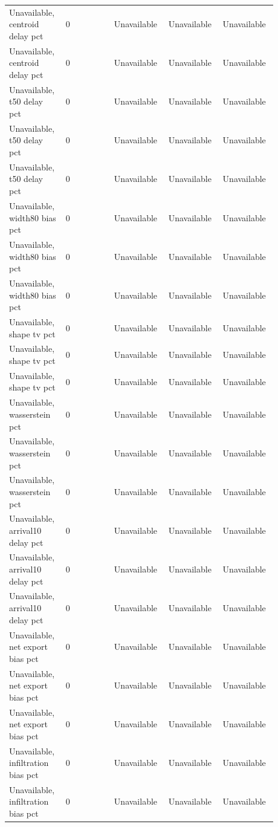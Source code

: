 \begin{longtable}{p{0.1760\linewidth}p{0.1760\linewidth}p{0.1760\linewidth}p{0.1760\linewidth}p{0.1760\linewidth}}
Unavailable, centroid delay pct & 0 & Unavailable & Unavailable & Unavailable \\
Unavailable, centroid delay pct & 0 & Unavailable & Unavailable & Unavailable \\
Unavailable, t50 delay pct & 0 & Unavailable & Unavailable & Unavailable \\
Unavailable, t50 delay pct & 0 & Unavailable & Unavailable & Unavailable \\
Unavailable, t50 delay pct & 0 & Unavailable & Unavailable & Unavailable \\
Unavailable, width80 bias pct & 0 & Unavailable & Unavailable & Unavailable \\
Unavailable, width80 bias pct & 0 & Unavailable & Unavailable & Unavailable \\
Unavailable, width80 bias pct & 0 & Unavailable & Unavailable & Unavailable \\
Unavailable, shape tv pct & 0 & Unavailable & Unavailable & Unavailable \\
Unavailable, shape tv pct & 0 & Unavailable & Unavailable & Unavailable \\
Unavailable, shape tv pct & 0 & Unavailable & Unavailable & Unavailable \\
Unavailable, wasserstein pct & 0 & Unavailable & Unavailable & Unavailable \\
Unavailable, wasserstein pct & 0 & Unavailable & Unavailable & Unavailable \\
Unavailable, wasserstein pct & 0 & Unavailable & Unavailable & Unavailable \\
Unavailable, arrival10 delay pct & 0 & Unavailable & Unavailable & Unavailable \\
Unavailable, arrival10 delay pct & 0 & Unavailable & Unavailable & Unavailable \\
Unavailable, arrival10 delay pct & 0 & Unavailable & Unavailable & Unavailable \\
Unavailable, net export bias pct & 0 & Unavailable & Unavailable & Unavailable \\
Unavailable, net export bias pct & 0 & Unavailable & Unavailable & Unavailable \\
Unavailable, net export bias pct & 0 & Unavailable & Unavailable & Unavailable \\
Unavailable, infiltration bias pct & 0 & Unavailable & Unavailable & Unavailable \\
Unavailable, infiltration bias pct & 0 & Unavailable & Unavailable & Unavailable \\

\end{longtable}
